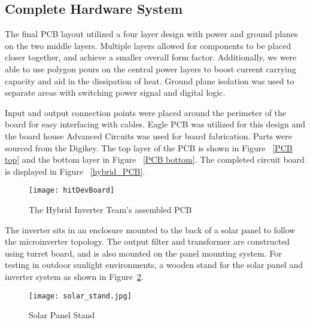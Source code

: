 \subsection{Complete Hardware System}
The final PCB layout utilized a four layer design with power and ground planes on the two middle layers. Multiple layers allowed for components to be placed closer together, and achieve a smaller overall form factor. Additionally, we were able to use polygon pours on the central power layers to boost current carrying capacity and aid in the dissipation of heat. Ground plane isolation was used to separate areas with switching power signal and digital logic.

Input and output connection points were placed around the perimeter of the board for easy interfacing with cables. Eagle PCB was utilized for this design and the board house Advanced Circuits was used for board fabrication. Parts were sourced from the Digikey. The top layer of the PCB is shown in Figure ~\ref{PCB top} and the bottom layer in Figure ~\ref{PCB bottom}. The completed circuit board is displayed in Figure ~\ref{hybrid_PCB}. 


\begin{figure}
\centering
\texttt{[image: hitDevBoard]}
\caption{The Hybrid Inverter Team's assembled PCB}
\label{The Hybrid Inverter Team's assembled PCB}
\end{figure}


The inverter sits in an enclosure mounted to the back of a solar panel to follow the microinverter topology. The output filter and transformer are constructed using turret board, and is also mounted on the panel mounting system. For testing in outdoor sunlight environments, a wooden stand for the solar panel and inverter system as shown in Figure~\ref{solar stand}.

\begin{figure}
\centering
\texttt{[image: solar\_stand.jpg]}
\caption{Solar Panel Stand}
\label{solar stand}
\end{figure}





